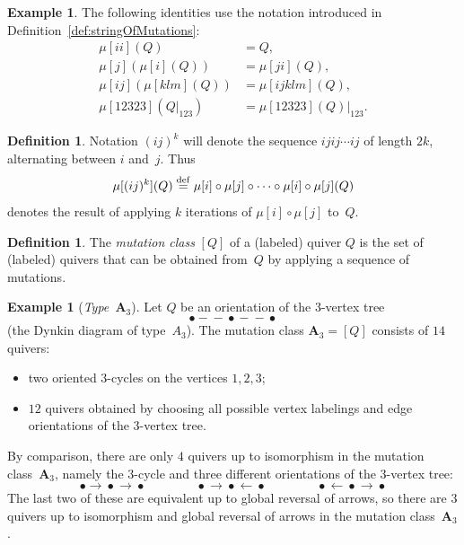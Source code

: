 \documentclass[11pt, letterpaper]{amsart}
\theoremstyle{definition}
\newtheorem{example}[theorem]{Example}
\newtheorem{definition}[theorem]{Definition}
\numberwithin{equation}{section}
\newcommand{\T}[2]{\mu[#1](#2)} %
\begin{document}
\begin{example}
\label{ex:notation-mu}
The following identities use the notation introduced in Definition~\ref{def:stringOfMutations}:
\begin{align*}
\T{i i}{Q} &= Q, \\
\T{j}{\T{i}{Q}} &= \T{j i }{Q}, \\
\T{i j } {\T{k l m}{Q}}&= \T{i j k l m}{Q}, \\
\T{1 2 3 2 3}{Q|_{123}} &= \T{12323}{Q}|_{123}.  
\end{align*}
\end{example}

\begin{definition}
\label{def:121212}
Notation $(i j)^k$ will denote the sequence $i j i j\cdots i j$ of length $2k$, alternating between $i$ and~$j$. 
Thus 
\[
\T{(i j)^k}{Q} \stackrel{\rm def}{=} \mu[i] \circ \mu[j] \circ \cdots \circ \mu[i] \circ \mu[j](Q)
\]
denotes the result of applying $k$ iterations of $\mu[i] \circ \mu[j]$ to~$Q$. %
\end{definition}


\begin{definition}
\label{def:mutationClass}
The \emph{mutation class} $[Q]$ of a (labeled) quiver $Q$ is the set of (labeled) quivers 
that can be obtained from~$Q$ by applying a sequence of mutations. 
\end{definition}

\begin{example}[\emph{Type~$\mathbf{A}_3$}]
Let $Q$ be an orientation of  the 3-vertex tree 
\begin{equation*}
\bullet\!\!-\!\!\!-\!\!\bullet\!\!-\!\!\!-\!\!\bullet 
\end{equation*}
(the Dynkin diagram of type~$A_3$). 
The mutation class $\mathbf{A}_3\!=\![Q]$ consists of $14$ quivers:
\begin{itemize}[leftmargin=.2in]
\item 
two oriented $3$-cycles on the vertices $1,2,3$; 
\item
$12$ quivers obtained by choosing all possible vertex labelings and edge orientations of the 3-vertex tree. 
\end{itemize}
By comparison, there are only $4$ quivers up to isomorphism in the mutation class~$\mathbf{A}_3$, 
namely the $3$-cycle and three different orientations of the 3-vertex tree:
\begin{equation*}
\bullet\!\rightarrow\!\bullet\!\rightarrow\!\bullet
\qquad\qquad
\bullet\!\rightarrow\!\bullet\!\leftarrow\!\bullet
\qquad\qquad
\bullet\!\leftarrow\!\bullet\!\rightarrow\!\bullet
\end{equation*}
The last two of these are equivalent up to global reversal of arrows, so there are $3$ quivers up to isomorphism and global reversal of arrows in the mutation class~$\mathbf{A}_3$.
\end{example}
\end{document}
